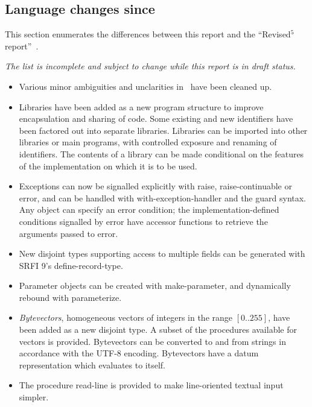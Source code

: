 

\subsection*{Language changes since \rfivers}
\label{differences}
This section enumerates the differences between this report and
the ``Revised$^5$ report''~\cite{R5RS}.

{\em The list is incomplete and subject to change while this report is in draft status.}


\begin{itemize}

\item Various minor ambiguities and unclarities in \rfivers\ have been cleaned up.

\item Libraries have been added as a new program structure to improve
encapsulation and sharing of code.  Some existing and new identifiers
have been factored out into separate libraries.
Libraries can be imported into other libraries or main programs, with
controlled exposure and renaming of identifiers.
The contents of a library can be made conditional on the features of
the implementation on which it is to be used.

\item Exceptions can now be signalled explicitly with {\cf raise},
{\cf raise-continuable} or {\cf error}, and can be handled with {\cf
with-exception-handler} and the {\cf guard} syntax.
Any object can specify an error condition; the implementation-defined
conditions signalled by {\cf error} have accessor functions to
retrieve the arguments passed to {\cf error}.

\item New disjoint types supporting access to multiple fields can be
generated with SRFI 9's {\cf define-record-type}.

\item Parameter objects can be created with {\cf make-parameter}, and
dynamically rebound with {\cf parameterize}.

\item {\em Bytevectors}, homogeneous vectors of integers in the range
$[0..255]$, have been added as a new disjoint type.
A subset of the procedures available for vectors is provided.  Bytevectors
can be converted to and from strings in accordance with the UTF-8 encoding.
Bytevectors have a datum representation which evaluates to itself.

\item The procedure {\cf read-line} is provided to make line-oriented textual input
simpler.


\end{itemize}
